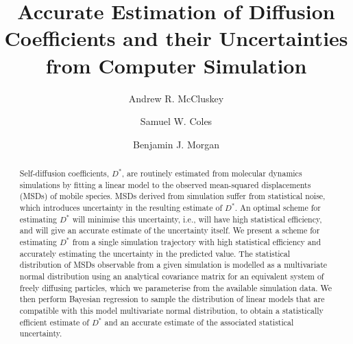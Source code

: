 \documentclass[reprint,superscriptaddress,nobibnotes,amsmath,amssymb,aps,prx,hidelinks,linenumbers]{revtex4-2}
\title@column\titleblock@produce
\makeatletter
\newcommand{\papertitle}{Accurate Estimation of Diffusion Coefficients and their Uncertainties from Computer Simulation}
\newcommand{\D}{\ensuremath{D^*}}
\def\maketitle{
\@author@finish
\title@column\titleblock@produce
\suppressfloats[t]}
\makeatother
\begin{document}
\let\oldaddcontentsline\addcontentsline%
\renewcommand{\addcontentsline}[3]{}

\title{\papertitle}

\author{Andrew R. McCluskey}
\author{Samuel W. Coles}
\author{Benjamin J. Morgan}

\begin{abstract}
    Self-diffusion coefficients, $\D$, are routinely estimated from molecular dynamics simulations by fitting a linear model to the observed mean-squared displacements (MSDs) of mobile species.
    MSDs derived from simulation suffer from statistical noise, which introduces uncertainty in the resulting estimate of $\D$.
    An optimal scheme for estimating $\D$ will minimise this uncertainty, i.e., will have high statistical efficiency, and will give an accurate estimate of the uncertainty itself.
    We present a scheme for estimating $\D$ from a single simulation trajectory with high statistical efficiency and accurately estimating the uncertainty in the predicted value.
    The statistical distribution of MSDs observable from a given simulation is modelled as a multivariate normal distribution using an analytical covariance matrix for an equivalent system of freely diffusing particles, which we parameterise from the available simulation data. 
    We then perform Bayesian regression to sample the distribution of linear models that are compatible with this model multivariate normal distribution, to obtain a statistically efficient estimate of $D^*$ and an accurate estimate of the associated statistical uncertainty.
\end{abstract}

\maketitle 
\end{document}
